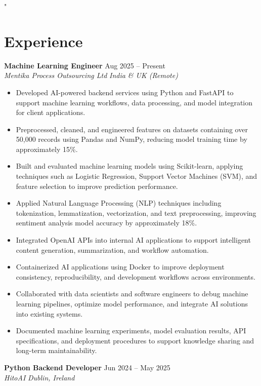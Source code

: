"\documentclass[10pt,a4paper]{article}
\newcommand{\resumeSubheading}[4]{
\textbf{#1} \hfill #2 \\
\textit{#3} \hfill \textit{#4}
}
\begin{document}
\section{Experience}
\resumeSubheading
{Machine Learning Engineer}{Aug 2025 -- Present}
{Mentika Process Outsourcing Ltd}{India \& UK (Remote)}
\begin{itemize}
\item Developed AI-powered backend services using Python and FastAPI to support machine learning workflows, data processing, and model integration for client applications.
\item Preprocessed, cleaned, and engineered features on datasets containing over 50,000 records using Pandas and NumPy, reducing model training time by approximately 15\%.
\item Built and evaluated machine learning models using Scikit-learn, applying techniques such as Logistic Regression, Support Vector Machines (SVM), and feature selection to improve prediction performance.
\item Applied Natural Language Processing (NLP) techniques including tokenization, lemmatization, vectorization, and text preprocessing, improving sentiment analysis model accuracy by approximately 18\%.
\item Integrated OpenAI APIs into internal AI applications to support intelligent content generation, summarization, and workflow automation.
\item Containerized AI applications using Docker to improve deployment consistency, reproducibility, and development workflows across environments.
\item Collaborated with data scientists and software engineers to debug machine learning pipelines, optimize model performance, and integrate AI solutions into existing systems.
\item Documented machine learning experiments, model evaluation results, API specifications, and deployment procedures to support knowledge sharing and long-term maintainability.
\end{itemize}
\resumeSubheading
{Python Backend Developer}{Jun 2024 -- May 2025}
{HitoAI}{Dublin, Ireland}
\end{document}
